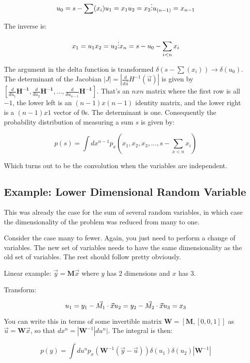 \begin{equation}
u_0 = s - \sum(x_i)\\
u_1 = x_1\\
u_2 = x_2\\
\vdots\\
u_{(n-1)} = x_{n-1}
\end{equation}

The inverse is:

\begin{equation}
x_1 = u_1\\
x_2 = u_2\\
\vdots\\
x_n = s - u_0 - \sum_{i<n} x_i
\end{equation}

The argument in the delta function is transformed $\delta(s - \sum(x_i)) \rightarrow \delta(u_0)$. The determinant of the Jacobian $|J| = |\frac{d}{d\vec{u}} H^{-1}(\vec{u})|$ is given by $[\frac{d}{du_1} \mathbf{H^{-1}},\frac{d}{du_2} \mathbf{H^{-1}},...,\frac{d}{du_{n-1}} \mathbf{H^{-1}}]$. That's an $nxn$ matrix where the first row is all $-1$, the lower left is an $(n-1)x(n-1)$ identity matrix, and the lower right is a $(n-1)x1$ vector of 0s. The determinant is one. Consequently the probability distribution of measuring a sum $s$ is given by:

\begin{equation}
p(s)= \int dx^{n-1} p_x(x_1,x_2,x_3,...,s-\sum_{x<n}x_i)
\end{equation}

Which turns out to be the convolution when the variables are independent.

\subsection{Example: Lower Dimensional Random Variable}

This was already the case for the sum of several random variables, in which case the dimensionality of the problem was reduced from many to one. 

Consider the case many to fewer. Again, you just need to perform a change of variables. The new set of variables needs to have the same dimensionality as the old set of variables. The rest should follow pretty obviously. 

Linear example: $\vec{y} = \mathbf{M}\vec{x}$ where $y$ has 2 dimensions and $x$ has 3. 

Transform:

\begin{equation}
u_1 = y_1 - \vec{M_1}\cdot\vec{x}\\
u_2 = y_2 - \vec{M_2}\cdot\vec{x}\\
u_3 = x_3
\end{equation}

You can write this in terms of some invertible matrix $\mathbf{W} = [\mathbf{M},[0,0,1]]$ as $\vec{u} = \mathbf{W}\vec{x}$, so that $dx^n = |\mathbf{W}^{-1}|du^n|$. The integral is then:

\begin{equation}
p(y) = \int du^n p_x(\mathbf{W}^{-1}(\vec{y}-\vec{u}))\delta(u_1)\delta(u_2)|\mathbf{W}^{-1}|
\end{equation}
